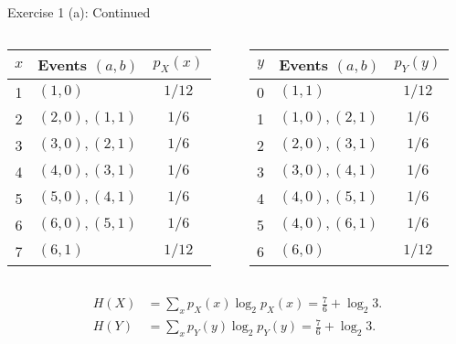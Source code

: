 \documentclass[aspectratio=169]{beamer}
\newcommand{\etpx}{H(X)}
\newcommand{\etpy}{H(Y)}
\begin{document}
\begin{frame}{Exercise 1 (a): Continued}
	\begin{columns}
		\begin{column}{0.5\textwidth}
			\begin{table}
				\begin{tabular}{c l c}
					\hline
					$x$ & Events $(a,b)$ & $p_X(x)$ \\
					\hline
					1 & $(1, 0)$	 & $1/12$ \\
					2 & $(2, 0), (1, 1)$	 & $1/6$ \\
					3 & $(3, 0), (2, 1)$	 & $1/6$ \\
					4 & $(4, 0), (3, 1)$	 & $1/6$ \\
					5 & $(5, 0), (4, 1)$	 & $1/6$ \\
					6 & $(6, 0), (5, 1)$	 & $1/6$ \\
					7 & $(6, 1)$	 & $1/12$ \\
					\hline
				\end{tabular}
			\end{table}
		\end{column}
		
		\begin{column}{0.5\textwidth}
			\begin{table}
				\begin{tabular}{c l c}
					\hline
					$y$ & Events $(a,b)$ & $p_Y(y)$ \\
					\hline
					0 & $(1, 1)$	 & $1/12$ \\
					1 & $(1, 0), (2, 1)$	 & $1/6$ \\
					2 & $(2, 0), (3, 1)$	 & $1/6$ \\
					3 & $(3, 0), (4, 1)$	 & $1/6$ \\
					4 & $(4, 0), (5, 1)$	 & $1/6$ \\
					5 & $(4, 0), (6, 1)$	 & $1/6$ \\
					6 & $(6, 0)$	 & $1/12$ \\
					\hline
				\end{tabular}
			\end{table}
		\end{column}
	\end{columns}
	
	\begin{align*}
		\etpx &= \sum_x p_X(x) \log_2 p_X(x) = \frac{7}{6} + \log_2 3. \\
		\etpy &= \sum_x p_Y(y) \log_2 p_Y(y) = \frac{7}{6} + \log_2 3. 
	\end{align*}

\end{frame}
\end{document}
